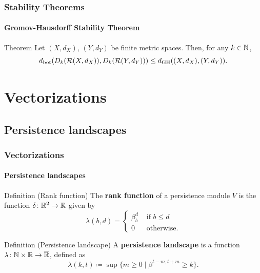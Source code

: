 \documentclass[aspectratio=169]{beamer}
\begin{document}
\begin{frame}
  \frametitle{Stability Theorems}
  \framesubtitle{Gromov-Hausdorff Stability Theorem}

  \begin{block}{Theorem}
    Let $ (X, d_X) $, $ (Y, d_Y) $ be finite metric spaces. Then, for any $ k \in \mathbb N$, 
    \begin{equation}
        d_{\operatorname{bot}}( D_k(\mathcal{R}(X, d_X)), D_k(\mathcal{R}(Y, d_Y))) \leq d_{\operatorname{GH}}((X, d_X), (Y, d_Y)).
    \end{equation}
  \end{block}

\end{frame}

\section{Vectorizations}
\subsection{Persistence landscapes}

\begin{frame}
  \frametitle{Vectorizations}
  \framesubtitle{Persistence landscapes}
  \begin{block}{Definition (Rank function)}
    The {\bf rank function} of a persistence module $ V $ is the function $ \delta \colon \mathbb R^2 \to \mathbb R $ given by
    \begin{equation}
        \lambda(b, d) = \begin{cases}
            \beta_b^d &\text{ if }  b \leq d \\
            0 &\text{ otherwise}.
        \end{cases}
    \end{equation}
  \end{block}
  \pause
  \begin{block}{Definition (Persistence landscape)}
    A {\bf persistence landscape} is a function $ \lambda \colon \mathbb N \times \mathbb R \to \overline {\mathbb R} $, defined as
    \begin{equation}
        \lambda(k, t) \coloneq \sup \{ m \geq 0 \mid \beta^{t-m, t+m} \geq k\}.
    \end{equation}
  \end{block}
\end{frame}
\end{document}
